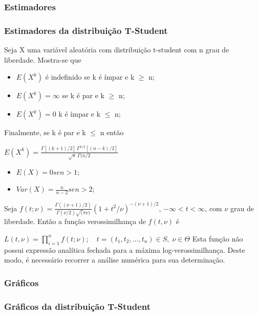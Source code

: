 \subsubsection{Estimadores}

\begin{frame}
\frametitle{Estimadores da distribuiç\~ao T-Student}

Seja X uma variável aleatória com distribuição t-student com n grau de liberdade. Mostra-se que

\begin{itemize}

\item $E(X^k)$ é indefinido se k é ímpar e k $\geq$ n;
\item $E(X^k)=\infty$ se k é par e k $\geq$ n;
\item $E(X^k)=0$ k é ímpar e k $\leq$ n;

\end{itemize} 

Finalmente, se k é par e k $\leq$ n então

\begin{center} $E(X^k) = \frac{\Gamma[(k + 1) / 2] \, \Gamma^{k/2}[(n - k) / 2]}{\sqrt{\pi} \, \Gamma(n / 2}$ \end{center}

\end{frame}

\begin{frame}

\begin{itemize}

\item $E(X) = 0 se n > 1;$
\item $Var(X) = \frac{n}{n-2} se n > 2;$

\end{itemize}
\end{frame}

\begin{frame}

Seja $f(t;\nu) = \displaystyle\frac{\Gamma ((\nu+1)/2)}{\Gamma(\nu/2)\sqrt(\pi \nu)} (1+t^2/\nu)^{-(\nu+1)/2}$, $-\infty < t < \infty$, com $\nu$ grau de liberdade. Então a função verossimilhança de $f(t,\nu)$ é

$L(t, \nu) = \prod_{i=1}^n f(t;\nu); \quad t = (t_1, t_2, \ldots, t_n) \in S, \; \nu \in \Theta$
Esta função não possui expressão analítica fechada para a máxima log-verossimilhança. Deste modo, é necessário recorrer a análise numérica para sua determinação.

\end{frame}

\subsubsection{Gr\' aficos}

\begin{frame}
\frametitle{Gráficos da distribuição T-Student}

\end{frame}
